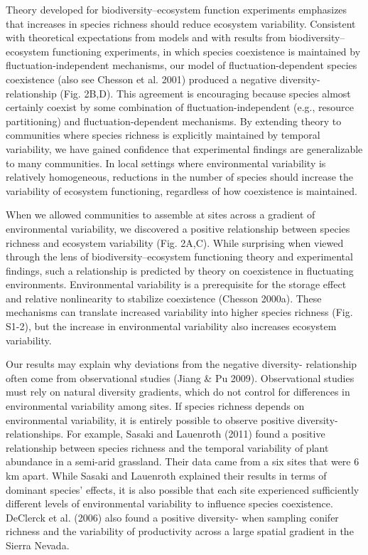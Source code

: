 \documentclass[12pt,]{article}
\begin{document}
Theory developed for biodiversity--ecosystem function experiments
emphasizes that increases in species richness should reduce ecosystem
variability. Consistent with theoretical expectations from models and
with results from biodiversity--ecosystem functioning experiments, in
which species coexistence is maintained by fluctuation-independent
mechanisms, our model of fluctuation-dependent species coexistence (also
see Chesson et al. 2001) produced a negative
diversity- relationship (Fig. 2B,D). This
agreement is encouraging because species almost certainly coexist by
some combination of fluctuation-independent (e.g., resource
partitioning) and fluctuation-dependent mechanisms. By extending theory
to communities where species richness is explicitly maintained by
temporal variability, we have gained confidence that experimental
findings are generalizable to many communities. In local settings where
environmental variability is relatively homogeneous, reductions in the
number of species should increase the variability of ecosystem
functioning, regardless of how coexistence is maintained.

When we allowed communities to assemble at sites across a gradient of
environmental variability, we discovered a positive relationship between
species richness and ecosystem variability (Fig. 2A,C). While surprising
when viewed through the lens of biodiversity--ecosystem functioning
theory and experimental findings, such a relationship is predicted by
theory on coexistence in fluctuating environments. Environmental
variability is a prerequisite for the storage effect and relative
nonlinearity to stabilize coexistence (Chesson 2000a). These mechanisms
can translate increased variability into higher species richness (Fig.
S1-2), but the increase in environmental variability also increases
ecosystem variability.

Our results may explain why deviations from the negative
diversity- relationship often come from
observational studies (Jiang \& Pu 2009). Observational studies must
rely on natural diversity gradients, which do not control for
differences in environmental variability among sites. If species
richness depends on environmental variability, it is entirely possible
to observe positive diversity- relationships.
For example, Sasaki and Lauenroth (2011) found a positive relationship
between species richness and the temporal variability of plant abundance
in a semi-arid grassland. Their data came from a six sites that were 6
km apart. While Sasaki and Lauenroth explained their results in terms of
dominant species' effects, it is also possible that each site
experienced sufficiently different levels of environmental variability
to influence species coexistence. DeClerck et al. (2006) also found a
positive diversity- when sampling conifer
richness and the variability of productivity across a large spatial
gradient in the Sierra Nevada.
\end{document}
